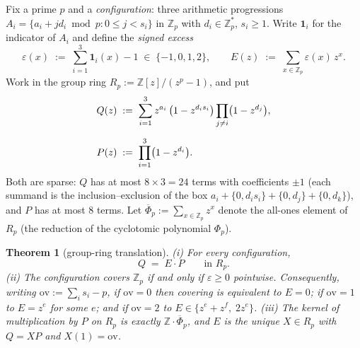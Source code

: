 \documentclass[11pt,a4paper]{article}
\numberwithin{equation}{section}
\theoremstyle{plain}
\newtheorem{theorem}{Theorem}[section]
\theoremstyle{definition}
\theoremstyle{remark}
\newcommand{\Z}{\mathbb{Z}}
\begin{document}
Fix a prime $p$ and a \emph{configuration}: three arithmetic progressions
$A_i=\{a_i+jd_i \bmod p:0\le j<s_i\}$ in $\Z_p$ with $d_i\in\Z_p^{*}$,
$s_i\ge 1$. Write $\mathbf 1_i$ for the indicator of $A_i$ and define the
\emph{signed excess}
\[
\varepsilon(x)\;:=\;\sum_{i=1}^{3}\mathbf 1_i(x)-1\;\in\;\{-1,0,1,2\},
\qquad
E(z)\;:=\;\sum_{x\in\Z_p}\varepsilon(x)\,z^x .
\]
Work in the group ring $R_p:=\Z[z]/(z^p-1)$, and put
\begin{align*}
Q(z)\;&:=\;\sum_{i=1}^{3} z^{a_i}\,\bigl(1-z^{d_i s_i}\bigr)
        \prod_{j\ne i}\bigl(1-z^{d_j}\bigr),\\[\medskipamount]
P(z)\;&:=\;\prod_{i=1}^{3}\bigl(1-z^{d_i}\bigr).
\end{align*}
Both are sparse: $Q$ has at most $8\times 3=24$ terms with coefficients
$\pm1$ (each summand is the inclusion--exclusion of the box
$a_i+\{0,d_is_i\}+\{0,d_j\}+\{0,d_k\}$), and $P$ has at most $8$ terms. Let
$\overline\Phi_p:=\sum_{x\in\Z_p}z^x$ denote the all-ones element of $R_p$
(the reduction of the cyclotomic polynomial $\Phi_p$).

\begin{theorem}[group-ring translation]\label{thm:GT}
\;\textup{(i)} For \emph{every} configuration,
\[
Q \;=\; E\cdot P \qquad\text{in } R_p .
\]
\textup{(ii)} The configuration covers $\Z_p$ if and only if
$\varepsilon\ge 0$ pointwise. Consequently, writing
$\mathrm{ov}:=\sum_i s_i-p$, if $\mathrm{ov}=0$ then covering is equivalent
to $E=0$; if $\mathrm{ov}=1$ to $E=z^e$ for some $e$; and if
$\mathrm{ov}=2$ to $E\in\{z^e+z^f,\;2z^e\}$.
\textup{(iii)} The kernel of multiplication by $P$ on $R_p$ is exactly
$\Z\cdot\overline\Phi_p$, and $E$ is the \emph{unique} $X\in R_p$ with
$Q=XP$ and $X(1)=\mathrm{ov}$.
\end{theorem}
\end{document}
